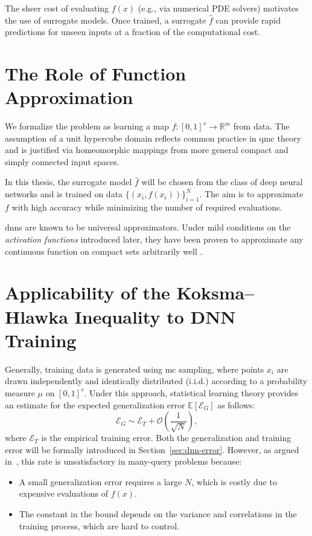 The sheer cost of evaluating $f(x)$ (e.g., via numerical PDE solvers) motivates
the use of surrogate models. Once trained, a surrogate $\hat{f}$ can provide
rapid predictions for unseen inputs at a fraction of the computational cost.

\section{The Role of Function Approximation}
We formalize the problem as learning a map $f \colon [0,1]^s \to \mathbb{R}^m$
from data. The assumption of a unit hypercube domain reflects common practice in
\ac{qmc} theory and is justified via homeomorphic mappings from more general
compact and simply connected input spaces.

In this thesis, the surrogate model $\hat{f}$ will be chosen from the class of
deep neural networks and is trained on data $\{(x_i, f(x_i))\}_{i=1}^N$. The aim
is to approximate $f$ with high accuracy while minimizing the number of required
evaluations.

\aclp{dnn} are known to be universal approximators. Under mild conditions on the \emph{activation functions} introduced later, they have been proven to 
approximate any continuous function on compact sets arbitrarily well
\cite{cybenko1989approximation}.

\section{Applicability of the Koksma--Hlawka Inequality to DNN Training}
Generally, training data is generated using \acl{mc} sampling, where points $x_i$ are drawn independently and identically distributed (i.i.d.) according to a probability measure $\mu$ on $[0,1]^s$. Under this approach, statistical learning theory provides an estimate for the expected generalization error $\mathbb{E}[\mathcal{E}_G]$ as follows:
\begin{equation*}
\mathcal{E}_G \sim \mathcal{E}_T + \mathcal{O}\left(\frac{1}{\sqrt{N}}\right),
\end{equation*}
where $\mathcal{E}_T$ is the empirical training error. Both the generalization
and training error will be formally introduced in Section~\ref{sec:dnn-error}.
However, as argued in~\cite{mishra2021enhancing}, this rate is unsatisfactory in
many-query problems because:
\begin{itemize}
  \item A small generalization error requires a large $N$, which is costly due
  to expensive evaluations of $f(x)$.
  \item The constant in the bound depends on the variance and correlations in
  the training process, which are hard to control.
\end{itemize}

